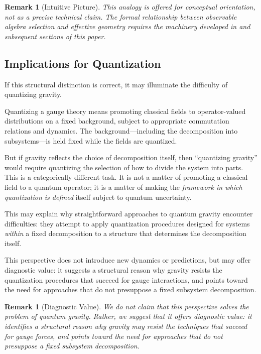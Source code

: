 \documentclass[12pt,a4paper,openany]{book}
\newtheorem{remark}[theorem]{Remark}
\begin{document}
\begin{remark}[Intuitive Picture]
This analogy is offered for conceptual orientation, not as a precise technical claim. The formal relationship between observable algebra selection and effective geometry requires the machinery developed in \cite{Liu2026PaperA} and subsequent sections of this paper.
\end{remark}

\subsection{Implications for Quantization}

If this structural distinction is correct, it may illuminate the difficulty of quantizing gravity.

Quantizing a gauge theory means promoting classical fields to operator-valued distributions on a fixed background, subject to appropriate commutation relations and dynamics. The background—including the decomposition into subsystems—is held fixed while the fields are quantized.

But if gravity reflects the choice of decomposition itself, then ``quantizing gravity'' would require quantizing the selection of how to divide the system into parts. This is a categorically different task. It is not a matter of promoting a classical field to a quantum operator; it is a matter of making the \emph{framework in which quantization is defined} itself subject to quantum uncertainty.

This may explain why straightforward approaches to quantum gravity encounter difficulties: they attempt to apply quantization procedures designed for systems \emph{within} a fixed decomposition to a structure that determines the decomposition itself.

This perspective does not introduce new dynamics or predictions, but may offer diagnostic value: it suggests a structural reason why gravity resists the quantization procedures that succeed for gauge interactions, and points toward the need for approaches that do not presuppose a fixed subsystem decomposition.

\begin{remark}[Diagnostic Value]
We do not claim that this perspective solves the problem of quantum gravity. Rather, we suggest that it offers diagnostic value: it identifies a structural reason why gravity may resist the techniques that succeed for gauge forces, and points toward the need for approaches that do not presuppose a fixed subsystem decomposition.
\end{remark}
\end{document}
